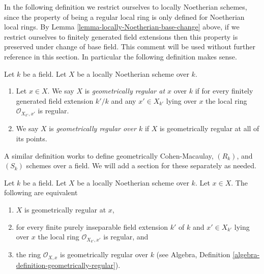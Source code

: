 \medskip\noindent
In the following definition we restrict ourselves to locally Noetherian
schemes, since the property of being a regular local ring is only
defined for Noetherian local rings. By
Lemma \ref{lemma-locally-Noetherian-base-change}
above, if we restrict ourselves to finitely generated field extensions then
this property is preserved under change of base field. This comment will be
used without further reference in this section. In particular the following
definition makes sense.

\begin{definition}
\label{definition-geometrically-regular}
Let $k$ be a field. Let $X$ be a locally Noetherian scheme over $k$.
\begin{enumerate}
\item Let $x \in X$. We say $X$ is {\it geometrically regular at $x$}
over $k$ if for every finitely generated field extension $k'/k$
and any $x' \in X_{k'}$ lying over $x$ the local ring
$\mathcal{O}_{X_{k'}, x'}$ is regular.
\item We say $X$ is {\it geometrically regular over $k$} if
$X$ is geometrically regular at all of its points.
\end{enumerate}
\end{definition}

\noindent
A similar definition works to define geometrically
Cohen-Macaulay, $(R_k)$, and $(S_k)$ schemes over a field.
We will add a section for these separately as needed.

\begin{lemma}
\label{lemma-geometrically-regular-at-point}
Let $k$ be a field.
Let $X$ be a locally Noetherian scheme over $k$.
Let $x \in X$.
The following are equivalent
\begin{enumerate}
\item $X$ is geometrically regular at $x$,
\item for every finite purely inseparable field extension $k'$ of $k$
and $x' \in X_{k'}$ lying over $x$ the local ring
$\mathcal{O}_{X_{k'}, x'}$ is regular, and
\item the ring $\mathcal{O}_{X, x}$ is geometrically
regular over $k$ (see
Algebra, Definition \ref{algebra-definition-geometrically-regular}).
\end{enumerate}
\end{lemma}

